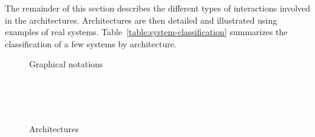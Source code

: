 \documentclass[preprint,3p,twocolumn]{elsarticle}
\begin{document}
The remainder of this section describes the different types of
interactions involved in the architectures. Architectures are then
detailed and illustrated using examples of real
systems. Table~\ref{table:system-classification} summarizes the
classification of a few systems by architecture.


\begin{figure}
\centering
\def\svgwidth{\columnwidth}

\caption{Graphical notations}
\label{fig:notations}
\end{figure}

\begin{figure}
\centering
\hspace*{0.2\columnwidth}
\hfill
{}\\
\hspace*{0.2\columnwidth}
\hfill
{}\\
\\
\caption{Architectures}
\label{fig:architectures}
\end{figure}
\end{document}
